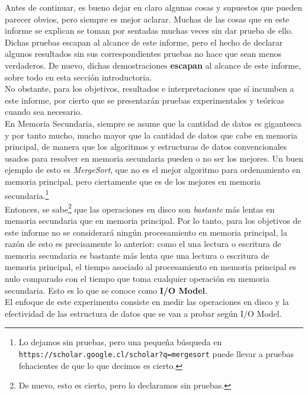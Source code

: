\documentclass[12pt,letterpaper]{report}
\begin{document}
Antes de continuar, es bueno dejar en claro algunas cosas y supuestos que pueden parecer obvios, pero siempre es mejor aclarar. Muchas de las cosas que en este informe se explican se toman por sentadas muchas veces sin dar prueba de ello. Dichas pruebas escapan al alcance de este informe, pero el hecho de declarar algunos resultados sin sus correspondientes pruebas no hace que sean menos verdaderos. De nuevo, dichas demostraciones \textbf{escapan} al alcance de este informe, sobre todo en esta sección introductoria.\\

No obstante, para los objetivos, resultados e interpretaciones que sí incumben a este informe, por cierto que se presentarán pruebas experimentales y teóricas cuando sea necesario.\\

En Memoria Secundaria, siempre se asume que la cantidad de datos es gigantesca y por tanto mucho, mucho mayor que la cantidad de datos que cabe en memoria principal, de manera que los algoritmos y estructuras de datos convencionales usados para resolver en memoria secundaria pueden o no ser los mejores. Un buen ejemplo de esto es \emph{MergeSort}, que no es el mejor algoritmo para ordenamiento en memoria principal, pero ciertamente que es de los mejores en memoria secundaria.\footnote{Lo dejamos sin pruebas, pero una pequeña búsqueda en \texttt{https://scholar.google.cl/scholar?q=mergesort} puede llevar a pruebas fehacientes de que lo que decimos es cierto.}\\

Entonces, se sabe\footnote{De nuevo, esto es cierto, pero lo declaramos sin pruebas.} que las operaciones en disco son \emph{bastante} más lentas en memoria secundaria que en memoria principal. Por lo tanto, para los objetivos de este informe no se considerará ningún procesamiento en memoria principal, la razón de esto es precisamente lo anterior: como el una lectura o escritura de memoria secundaria es bastante más lenta que una lectura o escritura de memoria principal, el tiempo asociado al procesamiento en memoria principal es nulo comparado con el tiempo que toma cualquier operación en memoria secundaria. Esto es lo que se conoce como \textbf{I/O Model}.\\

El enfoque de este experimento consiste en medir las operaciones en disco y la efectividad de las estructura de datos que se van a probar según I/O Model.\\
\end{document}
